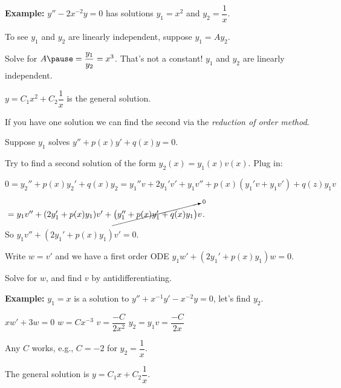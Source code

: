 \documentclass[10pt,aspectratio=169]{beamer}
\begin{document}
\begin{frame}
\textbf{Example:}
$y''-2x^{-2}y = 0$ has solutions $y_1 = x^2$ and $y_2 = \dfrac{1}{x}$.

\medskip
\pause

To see $y_1$ and $y_2$ are linearly independent, suppose
$y_1 = A y_2$.

\medskip
\pause

Solve for $A \pause = \dfrac{y_1}{y_2} = x^3$.
\pause
That's not a constant!
\pause \wthus $y_1$ and $y_2$ are linearly independent.

\medskip
\pause

\thus
\quad
$y = C_1 x^2 + C_2\dfrac{1}{x}$ \quad is the general solution.

\end{frame}

\begin{frame}
If you have one solution we can find the second
via the
\emph{reduction of order method}.

\medskip
\pause

Suppose $y_1$ solves
$y'' + p(x) y' + q(x) y = 0$.

\pause

Try to find a second solution of the form $y_2(x) = y_1(x) v(x)$.
\pause
Plug in:

\medskip

\quad
$
0 = y_2'' + p(x) y_2' + q(x) y_2
=
y_1'' v + 2 y_1' v' + y_1 v''
+ p(x) ( y_1' v + y_1 v' )
+ q(z) y_1 v$

\quad
\phantom{$0 = y_2'' + p(x) y_2' + q(x) y_2$}%
${} =
y_1 v''
+ (2 y_1' + p(x) y_1) v'
+
\cancelto{0}{\bigl( y_1'' + p(x) y_1' + q(x) y_1 \bigr)} v$.


\medskip
\pause

So
$y_1 v'' + (2 y_1' + p(x) y_1) v' = 0$.


\medskip
\pause

Write $w = v'$ and we have a first order ODE
\quad
$y_1 w' + (2 y_1' + p(x) y_1) w = 0$.

\medskip
\pause

Solve for $w$, and find $v$ by antidifferentiating.

\medskip
\pause

\textbf{Example:}
$y_1 = x$ is a solution to $y''+x^{-1}y'-x^{-2} y=0$, let's find $y_2$.

\medskip
\pause

\thus \quad $xw' + 3 w = 0$
\pause
\wthus
$w = Cx^{-3}$
\pause
\wthus
$v = \dfrac{-C}{2x^2}$
\pause
\wthus
$y_2 = y_1 v = \dfrac{-C}{2x}$

\medskip
\pause

Any $C$ works, e.g., $C=-2$ for $y_2 = \dfrac{1}{x}$.

\pause

The general solution is \quad $y = C_1 x + C_2\dfrac{1}{x}$.

\end{frame}
\end{document}
